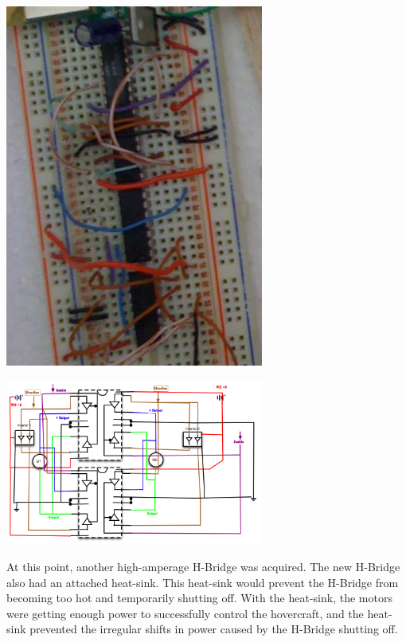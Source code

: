 \begin{center}
  \includegraphics[width=85mm]{imageSources/designProblemsHBridge1.png}
\end{center}
\label{HbridgeWiring}

\begin{center}
  \includegraphics[width=85mm]{imageSources/designProblemsHBridge2.png}
\end{center}
\label{HbridgeWiring2}

At this point, another high-amperage H-Bridge was acquired. The new H-Bridge also had an attached heat-sink. This heat-sink would prevent the H-Bridge from becoming too hot and temporarily shutting off. With the heat-sink, the motors were getting enough power to successfully control the hovercraft, and the heat-sink prevented the irregular shifts in power caused by the H-Bridge shutting off.

